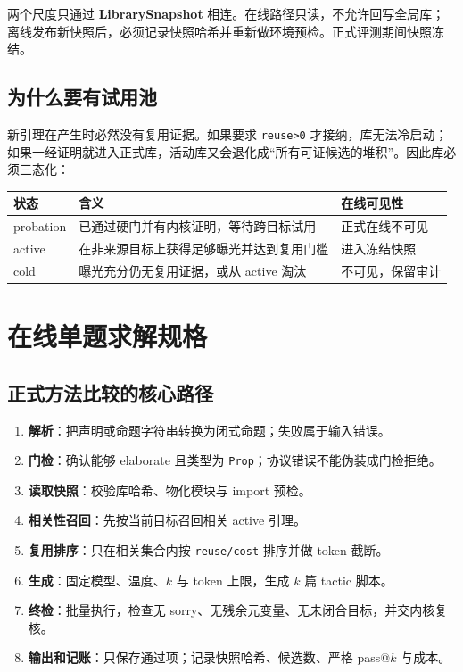 \documentclass[UTF8,a4paper,11pt,fontset=windows]{ctexart}
\newcommand{\code}[1]{\texttt{\small #1}}
\begin{document}
\begin{keybox}
两个尺度只通过 \textbf{LibrarySnapshot} 相连。在线路径只读，不允许回写全局库；
离线发布新快照后，必须记录快照哈希并重新做环境预检。正式评测期间快照冻结。
\end{keybox}

\subsection{为什么要有试用池}

新引理在产生时必然没有复用证据。如果要求 \code{reuse>0} 才接纳，库无法冷启动；
如果一经证明就进入正式库，活动库又会退化成“所有可证候选的堆积”。因此库必须三态化：

\begin{table}[htbp]
\centering
\small
\begin{tabularx}{\textwidth}{@{}p{2.5cm}Yp{3.2cm}@{}}
\toprule
\textbf{状态} & \textbf{含义} & \textbf{在线可见性} \\
\midrule
probation & 已通过硬门并有内核证明，等待跨目标试用 & 正式在线不可见 \\
active & 在非来源目标上获得足够曝光并达到复用门槛 & 进入冻结快照 \\
cold & 曝光充分仍无复用证据，或从 active 淘汰 & 不可见，保留审计 \\
\bottomrule
\end{tabularx}
\end{table}

\section{在线单题求解规格}

\subsection{正式方法比较的核心路径}

\begin{enumerate}[leftmargin=1.8em,itemsep=4pt]
  \item \textbf{解析}：把声明或命题字符串转换为闭式命题；失败属于输入错误。
  \item \textbf{门检}：确认能够 elaborate 且类型为 \code{Prop}；协议错误不能伪装成门检拒绝。
  \item \textbf{读取快照}：校验库哈希、物化模块与 import 预检。
  \item \textbf{相关性召回}：先按当前目标召回相关 active 引理。
  \item \textbf{复用排序}：只在相关集合内按 \code{reuse/cost} 排序并做 token 截断。
  \item \textbf{生成}：固定模型、温度、$k$ 与 token 上限，生成 $k$ 篇 tactic 脚本。
  \item \textbf{终检}：批量执行，检查无 sorry、无残余元变量、无未闭合目标，并交内核复核。
  \item \textbf{输出和记账}：只保存通过项；记录快照哈希、候选数、严格 pass@$k$ 与成本。
\end{enumerate}
\end{document}
